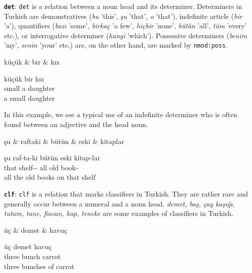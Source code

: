 \documentclass[11pt,a4paper]{article}
\begin{document}
\textbf{\texttt{det}}:
\texttt{det} is a relation between a noun head and its determiner. Determiners in Turkish are demonstratives (\textit{bu} 'this', \textit{şu} 'that', \textit{o} 'that'), indefinite article (\textit{bir} 'a'), quantifiers (\textit{bazı} 'some', \textit{birkaç} 'a few', \textit{hiçbir} 'none', \textit{bütün} 'all', \textit{tüm} 'every' etc.), or interrogative determiner (\textit{hangi} 'which'). Possessive determiners (\textit{benim} 'my', \textit{senin} 'your' etc.) are, on the other hand, are marked by \texttt{nmod:poss}.

\begin{exe}
\ex \label{det}
\begin{dependency}
\begin{deptext}
küçük \& bir \& kız \\
\end{deptext}
\end{dependency}
\gll küçük bir kız  \\
small a daughter \\
\glt a small daughter
\end{exe}

In this example, we see a typical use of an indefinite determiner who is often found between an adjective and the head noun.

\begin{exe}
\ex \label{det}
\begin{dependency}
\begin{deptext}
şu \& raftaki \& bütün \& eski \& kitaplar \\
\end{deptext}
\end{dependency}
\gll şu raf-ta-ki bütün eski kitap-lar  \\
that shelf-\Loc{}-\Adj{} all old book-\Pl{} \\
\glt all the old books on that shelf
\end{exe}

\textbf{\texttt{clf}}:
\texttt{clf} is a relation that marks classifiers in Turkish. They are rather rare and generally occur between a numeral and a noun head. \textit{demet, baş, çay kaşığı, tutam, tane, fincan, kap, teneke} are some examples of classifiers in Turkish.

\begin{exe}
\ex \label{det}
\begin{dependency}
\begin{deptext}
üç \& demet \& havuç \\
\end{deptext}
\end{dependency}
\gll üç demet havuç \\
three bunch carrot \\
\glt three bunches of carrot
\end{exe}
\end{document}
